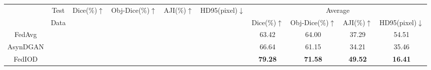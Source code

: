 \documentclass[letterpaper]{article} %
\newcommand{\cmark}{\ding{51}}%
\newcommand{\xmark}{\ding{55}}%
\begin{document}
\begin{table}
\centering
\resizebox{\textwidth}{!}
{
\begin{tabular}{c|ccccc|cccc}
\toprule
&Test   &\multirow{2}{*}{Dice(\%)$\uparrow$} &\multirow{2}{*}{Obj-Dice(\%)$\uparrow$} &\multirow{2}{*}{{AJI(\%)$\uparrow$}} &\multirow{2}{*}{HD95(pixel)$\downarrow$} &\multicolumn{4}{c}{Average}\\
&Data & & & &  &Dice(\%)$\uparrow$ &{Obj-Dice(\%)$\uparrow$} &{AJI(\%)$\uparrow$} &HD95(pixel)$\downarrow$\\
\midrule
\multirow{3}{*}{FedAvg}
&\cellcolor{gray0}{Cell17}  &\cellcolor{gray0}{68.74} &\cellcolor{gray0}{65.82} &\cellcolor{gray0}{39.37}  &\cellcolor{gray0}{24.15} &\multirow{3}{*}{63.42} &\multirow{3}{*}{64.00} &\multirow{3}{*}{37.29}  &\multirow{3}{*}{54.51} \\
&\cellcolor{gray1}{TCGA}  &\cellcolor{gray1}{77.57} &\cellcolor{gray1}{72.94} &\cellcolor{gray1}{50.03} &\cellcolor{gray1}{15.87} & & &  \\
&\cellcolor{gray2}{TNBC}  &\cellcolor{gray2}{43.95} &\cellcolor{gray2}{53.23} &\cellcolor{gray2}{22.48} &\cellcolor{gray2}{123.51} & & &  \\ \midrule
\multirow{3}{*}{AsynDGAN}
&\cellcolor{gray0}{Cell17}  &\cellcolor{gray0}{79.82} &\cellcolor{gray0}{59.03} &\cellcolor{gray0}{34.64} &\cellcolor{gray0}{19.27} &\multirow{3}{*}{66.64}   &\multirow{3}{*}{61.15} &\multirow{3}{*}{34.21}  &\multirow{3}{*}{35.46} \\
&\cellcolor{gray1}{TCGA}  &\cellcolor{gray1}{52.29} &\cellcolor{gray1}{57.12} &\cellcolor{gray1}{26.03} &\cellcolor{gray1}{47.47} & & &  \\
&\cellcolor{gray2}{TNBC}  &\cellcolor{gray2}{67.80} &\cellcolor{gray2}{67.31} &\cellcolor{gray2}{41.96} &\cellcolor{gray2}{39.63} & & &  \\ \midrule
\multirow{3}{*}{FedIOD}
&\cellcolor{gray0}{Cell17} &\cellcolor{gray0}{86.23} &\cellcolor{gray0}{68.03} &\cellcolor{gray0}{44.75} &\cellcolor{gray0}{7.01}  &\multirow{3}{*}{\bf{79.28}}  &\multirow{3}{*}{\bf{71.58}} &\multirow{3}{*}{\bf{49.52}} &\multirow{3}{*}{\bf{16.41}}  \\

\end{tabular}}
\end{table}
\end{document}
